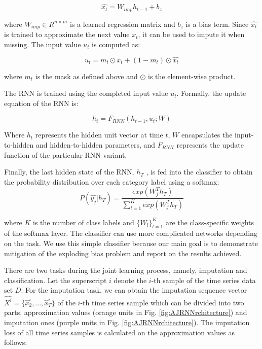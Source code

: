 \begin{equation}
  \hat{x_t} = W_{imp} h_{t-1} + b_z
\end{equation}

where $W_{imp} \in R^{n \times  m}$ is a learned regression matrix and $b_z$ is a bias term. 
Since $\hat{x_t}$ is trained to approximate the next value $x_t$, it can be used to impute it when missing. 
The input value $u_t$ is computed as:

\begin{equation}
  u_t = m_t \odot x_t + (1 - m_t) \odot \hat{x_t}
  \label{eq:AJRNNinput}
\end{equation}

where $m_t$ is the mask as defined above and $\odot$ is the element-wise product.

The RNN is trained using the completed input value $u_t$.
Formally, the update equation of the RNN is:

\begin{equation}
  h_t = F_{RNN} (h_{t-1}, u_t; W)
\end{equation}

Where $h_t$ represents the hidden unit vector at time $t$, $W$ encapsulates the input-to-hidden and hidden-to-hidden parameters, and $F_{RNN}$ represents the update function of the particular RNN variant.

Finally, the last hidden state of the RNN, $h_T$ , is fed into the classifier to obtain the probability distribution over each category label using a softmax:
\begin{equation}
  P(\hat{y_j}|h_T ) = \frac{exp(W^T_j  h_T )}{\sum_{l=1}^K exp(W^T_j  h_T )}
  \label{eq:AJRNNsoftmax}
\end{equation}

where $K$ is the number of class labels and $\{W_l\}^K_{l=1}$ are the class-specific weights of the softmax layer.
The classifier can use more complicated networks depending on the task.
We use this simple classifier because our main goal is to demonstrate mitigation of the exploding bias problem and report on the results achieved.

There are two tasks during the joint learning process, namely, imputation and classification. 
Let the superscript $i$ denote the $i$-th sample of the time series data set $D$.
For the imputation task, we can obtain the imputation sequence vector $\hat{X^i} = \{ \hat{x}^i_2, ..., \hat{x}^i_T \}$ 
of the $i$-th time series sample which can be divided into two parts, approximation values
(orange units in Fig. \ref{fig:AJRNNrchitecture}) and imputation ones (purple units
in Fig. \ref{fig:AJRNNrchitecture}). 
The imputation loss of all time series samples is calculated on the approximation values as follows:

